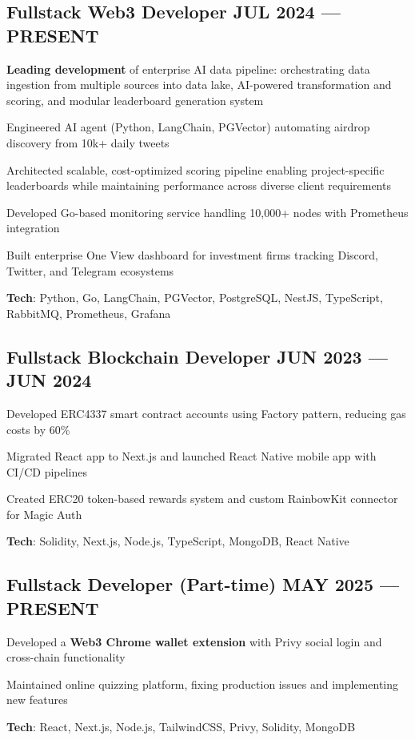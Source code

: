\documentclass[letter,10pt]{article}
\begin{document}
\subsection{{Fullstack Web3 Developer \hfill JUL 2024 --- PRESENT}}
\begin{zitemize}
  \item \textbf{Leading development} of enterprise AI data pipeline: orchestrating data ingestion from multiple sources into data lake, AI-powered transformation and scoring, and modular leaderboard generation system
  \item Engineered AI agent (Python, LangChain, PGVector) automating airdrop discovery from 10k+ daily tweets
  \item Architected scalable, cost-optimized scoring pipeline enabling project-specific leaderboards while maintaining performance across diverse client requirements
  \item Developed Go-based monitoring service handling 10,000+ nodes with Prometheus integration
  \item Built enterprise One View dashboard for investment firms tracking Discord, Twitter, and Telegram ecosystems
  \item \textbf{Tech}: Python, Go, LangChain, PGVector, PostgreSQL, NestJS, TypeScript, RabbitMQ, Prometheus, Grafana
\end{zitemize}


\subsection{{Fullstack Blockchain Developer \hfill JUN 2023 --- JUN 2024}}
\begin{zitemize}
  \item Developed ERC4337 smart contract accounts using Factory pattern, reducing gas costs by 60\%
  \item Migrated React app to Next.js and launched React Native mobile app with CI/CD pipelines
  \item Created ERC20 token-based rewards system and custom RainbowKit connector for Magic Auth
  \item \textbf{Tech}: Solidity, Next.js, Node.js, TypeScript, MongoDB, React Native
\end{zitemize}

\subsection{{Fullstack Developer (Part-time) \hfill MAY 2025 --- PRESENT}}
\begin{zitemize}
  \item Developed a \textbf{Web3 Chrome wallet extension} with Privy social login and cross-chain functionality
  \item Maintained online quizzing platform, fixing production issues and implementing new features
  \item \textbf{Tech}: React, Next.js, Node.js, TailwindCSS, Privy, Solidity, MongoDB
\end{zitemize}
\end{document}
